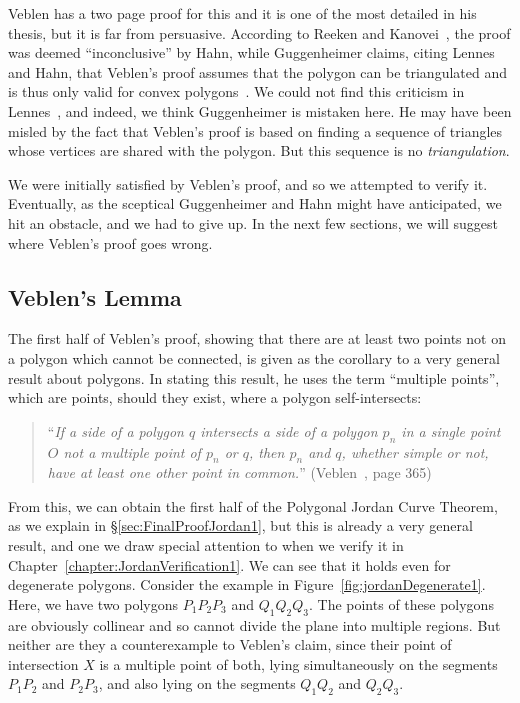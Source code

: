 Veblen has a two page proof for this and it is one of the most detailed in his thesis, but it is far from persuasive. According to Reeken and Kanovei~\cite{HahnInconclusiveIndirect}, the proof was deemed ``inconclusive'' by Hahn, while Guggenheimer claims, citing Lennes and Hahn, that Veblen's proof assumes that the polygon can be triangulated and is thus only valid for convex polygons~\cite{GuggenheimerJordanCurve}. We could not find this criticism in Lennes~\cite{LennesPolygon}, and indeed, we think Guggenheimer is mistaken here. He may have been misled by the fact that Veblen's proof is based on finding a sequence of triangles whose vertices are shared with the polygon. But this sequence is no \emph{triangulation}. 

We were initially satisfied by Veblen's proof, and so we attempted to verify it. Eventually, as the sceptical Guggenheimer and Hahn might have anticipated, we hit an obstacle, and we had to give up. In the next few sections, we will suggest where Veblen's proof goes wrong.

\subsection{Veblen's Lemma}\label{sec:VeblenLemma1}
The first half of Veblen's proof, showing that there are at least two points not on a polygon which cannot be connected, is given as the corollary to a very general result about polygons. In stating this result, he uses the term ``multiple points'', which are points, should they exist, where a polygon self-intersects:
\begin{quote}
``\emph{If a side of a polygon $q$ intersects a side of a polygon $p_n$ in a single point $O$ not a multiple point of $p_n$ or $q$, then $p_n$ and $q$, whether simple or not, have at least one other point in common.}'' (Veblen~\cite{Veblenphd}, page 365)
\end{quote}

From this, we can obtain the first half of the Polygonal Jordan Curve Theorem, as we explain in \S\ref{sec:FinalProofJordan1}, but this is already a very general result, and one we draw special attention to when we verify it in Chapter~\ref{chapter:JordanVerification1}. We can see that it holds even for  degenerate polygons. Consider the example in Figure~\ref{fig:jordanDegenerate1}. Here, we have two polygons $P_1P_2P_3$ and $Q_1Q_2Q_3$. The points of these polygons are obviously collinear and so cannot divide the plane into multiple regions. But neither are they a counterexample to Veblen's claim, since their point of intersection $X$ is a multiple point of both, lying simultaneously on the segments $P_1P_2$ and $P_2P_3$, and also lying on the segments $Q_1Q_2$ and $Q_2Q_3$.

